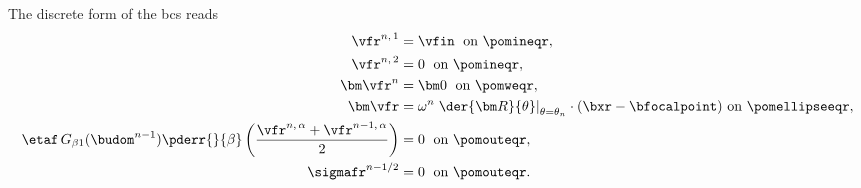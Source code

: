 The discrete form of the \acp{bc}  reads
\bw
\begin{align}
        \label{bc_fl_rigid_1_reference_disc}
        \vfr^{n, \, 1}                                                                                                        & = \vfin \; \text{ on }\pomineqr,                                                                                                          \\
        \label{bc_fl_rigid_2_reference_disc}
        \vfr^{n, \, 2}                                                                                                        & =  0 \; \text{ on } \pomineqr ,                                                                                                           \\
        \label{bc_fl_rigid_3_reference_disc}
        {\bm \vfr}^n                                                                                                          & = {\bm 0} \; \text{ on } \pomweqr ,                                                                                                       \\
        \label{bc_fl_rigid_4_reference_disc}
        {\bm \vfr}                                                                                                            & =
        \omega^n  \left. \der{{\bm R}}{\theta} \right|_{\theta = \theta_n} \cdot (\bxr - \bfocalpoint)  \text{ on } \pomellipseeqr ,                                                                                                                                      \\
        \label{bc_fl_rigid_5_reference_disc}
        \etaf \, G_{\beta 1}(\budom^{n-1}) \pderr{}{\beta}\left( \frac{\vfr^{n, \, \alpha} + \vfr^{n-1, \, \alpha}}{2}\right) & = 0                                                                                                           \; \text{ on } \pomouteqr , \\
        \label{bc_fl_rigid_6_reference_disc}
        \sigmafr^{n-1/2}                                                                                                      & = 0 \; \text{ on } \pomouteqr.
\end{align}
\ew

